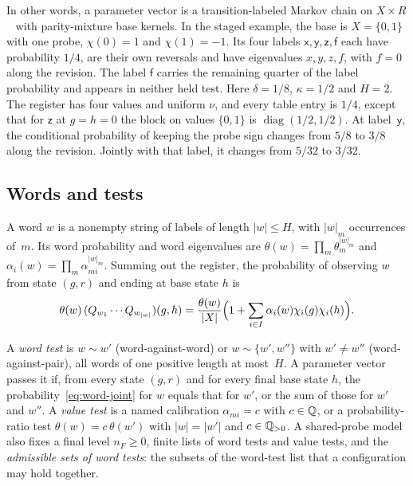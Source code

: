 In other words, a parameter vector is a transition-labeled Markov chain
on $X\times R$~\cite[Definition~1]{chenkiefer2014} with parity-mixture
base kernels.
In the staged example, the base is
$X=\{0,1\}$ with one probe, $\chi(0)=1$ and $\chi(1)=-1$. Its four labels
$\mathsf x,\mathsf y,\mathsf z,\mathsf f$ each have probability $1/4$, are
their own reversals and have eigenvalues $x,y,z,f$, with $f=0$ along the revision. The label $\mathsf f$ carries the
remaining quarter of the label probability and appears in neither
held test. Here $\delta=1/8$, $\kappa=1/2$ and $H=2$. The register has four values
and uniform $\nu$, and every table entry is $1/4$, except that for
$\mathsf z$ at $g=h=0$ the block on values $\{0,1\}$ is
$\operatorname{diag}(1/2,1/2)$.
At label~$\mathsf y$, the conditional probability of keeping the probe
sign changes from $5/8$ to $3/8$ along the revision. Jointly with that
label, it changes from $5/32$ to $3/32$.

\subsection{Words and tests}\label{sec:words}

A word $w$ is a nonempty string of labels of
length $|w|\le H$, with $|w|_m$ occurrences of~$m$. Its word probability
and word eigenvalues are $\theta(w)=\prod_m\theta_m^{|w|_m}$ and
$\alpha_i(w)=\prod_m\alpha_{mi}^{|w|_m}$. Summing out the register, the
probability of observing $w$ from state $(g,r)$ and ending at base state
$h$ is
\begin{equation}\label{eq:word-joint}
  \theta(w)\,(Q_{w_1}\cdots Q_{w_{|w|}})(g,h)
  =\frac{\theta(w)}{|X|}\Bigl(1+\sum_{i\in I}\alpha_i(w)\chi_i(g)\chi_i(h)\Bigr).
\end{equation}

\begin{definition}\label{def:tests}
A \emph{word test} is $w\sim w'$ (word-against-word) or $w\sim\{w',w''\}$
with $w'\neq w''$ (word-against-pair), all words of one positive length at
most~$H$. A parameter vector passes it if, from every state $(g,r)$ and for
every final base state $h$, the probability~\eqref{eq:word-joint} for $w$
equals that for $w'$, or the sum of those for $w'$ and $w''$. A
\emph{value test} is a named calibration $\alpha_{mi}=c$ with $c\in\mathbb{Q}$, or
a probability-ratio test $\theta(w)=c\,\theta(w')$ with $|w|=|w'|$ and
$c\in\mathbb{Q}_{>0}$. A shared-probe model also fixes a final level $n_F\ge0$,
finite lists of word tests and value tests, and the
\emph{admissible sets of word tests}: the subsets of the word-test list
that a configuration may hold together.
\end{definition}

